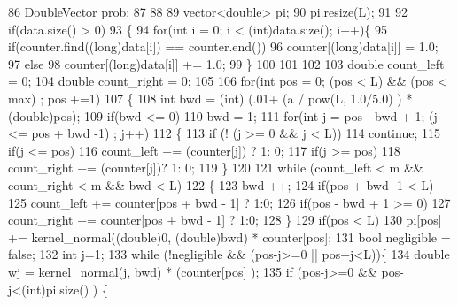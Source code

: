 \begin{DoxyCode}
86     DoubleVector prob;
87 
88 
89     vector<double> pi;
90     pi.resize(L);
91 
92     \textcolor{keywordflow}{if}(data.size() > 0)
93       \{
94           \textcolor{keywordflow}{for}(\textcolor{keywordtype}{int} i = 0; i < (int)data.size(); i++)\{
95               \textcolor{keywordflow}{if}(counter.find((\textcolor{keywordtype}{long})data[i]) == counter.end())
96                   counter[(\textcolor{keywordtype}{long})data[i]] = 1.0;
97               \textcolor{keywordflow}{else}
98                   counter[(long)data[i]] += 1.0;
99           \}
100 
101 
102 
103         \textcolor{keywordtype}{double} count\_left = 0;
104         \textcolor{keywordtype}{double} count\_right = 0;
105 
106         \textcolor{keywordflow}{for}(\textcolor{keywordtype}{int} pos = 0; (pos < L) && (pos < max) ; pos +=1)
107             \{
108               \textcolor{keywordtype}{int} bwd = (int) (.01+ (a / pow(L, 1.0/5.0) ) * (\textcolor{keywordtype}{double})pos);
109               \textcolor{keywordflow}{if}(bwd <= 0)
110                 bwd = 1;
111               \textcolor{keywordflow}{for}(\textcolor{keywordtype}{int} j = pos - bwd + 1;  (j <= pos + bwd -1)  ; j++)
112                 \{
113                   \textcolor{keywordflow}{if} (! (j >= 0 && j < L))
114                     \textcolor{keywordflow}{continue};
115                   \textcolor{keywordflow}{if}(j <= pos)
116                     count\_left += (counter[j]) ? 1: 0;
117                   \textcolor{keywordflow}{if}(j >= pos)
118                     count\_right += (counter[j])? 1: 0;
119                 \}
120 
121               \textcolor{keywordflow}{while} (count\_left < m && count\_right < m && bwd < L)
122                 \{
123                   bwd ++;
124                   \textcolor{keywordflow}{if}(pos + bwd -1 < L)
125                     count\_left += counter[pos + bwd - 1] ? 1:0;
126                   \textcolor{keywordflow}{if}(pos - bwd + 1 >= 0)
127                     count\_right += counter[pos + bwd - 1] ? 1:0;
128                 \}
129               \textcolor{keywordflow}{if}(pos < L)
130                 pi[pos] += kernel\_normal((\textcolor{keywordtype}{double})0, (\textcolor{keywordtype}{double})bwd) * counter[pos];
131               \textcolor{keywordtype}{bool} negligible = \textcolor{keyword}{false};
132               \textcolor{keywordtype}{int} j=1;
133               \textcolor{keywordflow}{while} (!negligible && (pos-j>=0 || pos+j<L))\{
134                 \textcolor{keywordtype}{double}  wj = kernel\_normal(j, bwd) * (counter[pos] );
135                 \textcolor{keywordflow}{if} (pos-j>=0 && pos-j<(\textcolor{keywordtype}{int})pi.size() ) \{

\end{DoxyCode}

